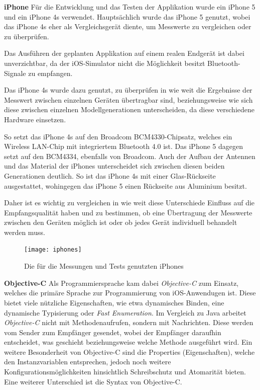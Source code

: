 \textbf{iPhone}
Für die Entwicklung und das Testen der Applikation wurde ein iPhone 5 und ein iPhone 4s verwendet. 
Hauptsächlich wurde das iPhone 5 genutzt, wobei das iPhone 4s eher als Vergleichsgerät diente, um Messwerte zu vergleichen oder zu überprüfen.

Das Ausführen der geplanten Applikation auf einem realen Endgerät ist dabei unverzichtbar, da der iOS-Simulator nicht die Möglichkeit besitzt Bluetooth-Signale zu empfangen.

Das iPhone 4s wurde dazu genutzt, zu überprüfen in wie weit die Ergebnisse der Messwert zwischen einzelnen Geräten übertragbar sind, beziehungsweise wie sich diese zwischen einzelnen Modellgenerationen unterscheiden, da diese verschiedene Hardware einsetzen. 

So setzt das iPhone 4s auf den Broadcom BCM4330-Chipsatz, welches ein Wireless LAN-Chip mit integriertem Bluetooth 4.0 ist. Das iPhone 5 dagegen setzt auf den BCM4334, ebenfalls von Broadcom. 
Auch der Aufbau der Antennen und das Material der iPhones unterscheidet sich zwischen diesen beiden Generationen deutlich. 
So ist das iPhone 4s mit einer Glas-Rückseite ausgestattet, wohingegen das iPhone 5 einen Rückseite aus Aluminium besitzt.

Daher ist es wichtig zu vergleichen in wie weit diese Unterschiede Einfluss auf die Empfangsqualität haben und zu bestimmen, ob eine Übertragung der Messwerte zwischen den Geräten möglich ist oder ob jedes Gerät individuell behandelt werden muss.

\begin{figure}[htb!]
		\centering
	\texttt{[image: iphones]}
	\caption{Die für die Messungen und Tests genutzten iPhones}
	\label{iphones}
\end{figure}

\textbf{Objective-C}
Als Programmiersprache kam dabei \emph{Objective-C} zum Einsatz, welches die primäre Sprache zur Programmierung von iOS-Anwendugen ist. 
Diese bietet viele nützliche Eigenschaften, wie etwa dynamisches Binden, eine dynamische Typisierung oder \emph{Fast Enumeration}.
Im Vergleich zu Java arbeitet \emph{Objective-C} nicht mit Methodenaufrufen, sondern mit Nachrichten. Diese werden vom Sender zum Empfänger gesendet, wobei der Empfänger daraufhin entscheidet, was geschieht beziehungsweise welche Methode ausgeführt wird. Ein weitere Besonderheit von Objective-C sind die Properties (Eigenschaften), welche den Instanzvariablen entsprechen, jedoch noch weitere Konfigurationsmöglichkeiten hinsichtlich Schreibschutz und Atomarität bieten.
Eine weiterer Unterschied ist die Syntax von Objective-C.

